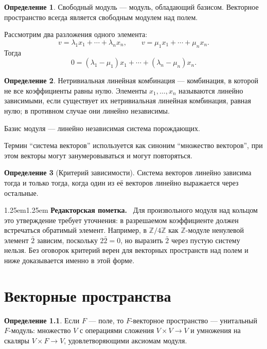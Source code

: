 \documentclass[12pt,a4paper,oneside,openany]{book}
\theoremstyle{definition}
\newtheorem{definition}{Определение}[chapter]
\theoremstyle{plain}
\theoremstyle{remark}
\newenvironment{editorialnote}
  {\begin{adjustwidth}{1.25em}{1.25em}\small
   \noindent\textcolor{editorred}{\sffamily\bfseries Редакторская пометка.}\ }
  {\par\end{adjustwidth}}
\newcommand{\Z}{\mathbb{Z}}
\begin{document}
\begin{definition}
Свободный модуль --- модуль, обладающий базисом. Векторное пространство
всегда является свободным модулем над полем.
\end{definition}

Рассмотрим два разложения одного элемента:
\[
  v=\lambda_1x_1+\cdots+\lambda_nx_n,
  \qquad
  v=\mu_1x_1+\cdots+\mu_nx_n.
\]
Тогда
\[
  0=(\lambda_1-\mu_1)x_1+\cdots+(\lambda_n-\mu_n)x_n.
\]

\begin{definition}
Нетривиальная линейная комбинация --- комбинация, в которой не все
коэффициенты равны нулю. Элементы $x_1,\ldots,x_n$ называются линейно
зависимыми, если существует их нетривиальная линейная комбинация, равная
нулю; в противном случае они линейно независимы.
\end{definition}

Базис модуля --- линейно независимая система порождающих.


Термин ``система векторов'' используется как синоним ``множество
векторов'', при этом векторы могут занумеровываться и могут повторяться.

\begin{definition}[Критерий зависимости]
Система векторов линейно зависима тогда и только тогда, когда один из её
векторов линейно выражается через остальные.
\end{definition}

\begin{editorialnote}
Для произвольного модуля над кольцом это утверждение требует уточнения:
в разрешаемом коэффициенте должен встречаться обратимый элемент. Например,
в $\Z/4\Z$ как $\Z$-модуле ненулевой элемент $\bar2$ зависим, поскольку
$2\bar2=0$, но выразить $\bar2$ через пустую систему нельзя. Без
оговорок критерий верен для векторных пространств над полем и ниже
доказывается именно в этой форме.
\end{editorialnote}

\chapter{Векторные пространства}

\begin{definition}
Если $F$ --- поле, то $F$-векторное пространство --- унитальный
$F$-модуль: множество $V$ с операциями сложения
$V\times V\to V$ и умножения на скаляры
$V\times F\to V$, удовлетворяющими аксиомам модуля.
\end{definition}
\end{document}
